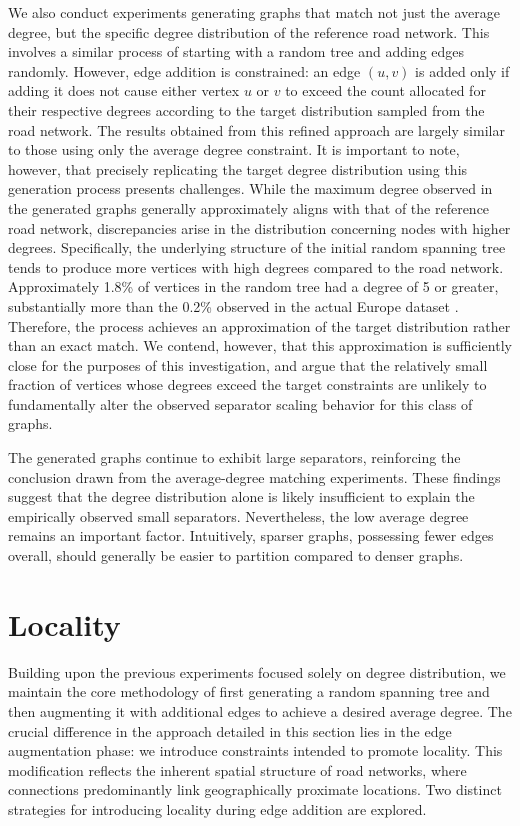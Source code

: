 We also conduct experiments generating graphs that match not just the average degree, but the specific degree distribution of the reference road network.
This involves a similar process of starting with a random tree and adding edges randomly.
However, edge addition is constrained: an edge \( (u, v) \) is added only if adding it does not cause either vertex \(u\) or \(v\) to exceed the count allocated for their respective degrees according to the target distribution sampled from the road network.
The results obtained from this refined approach are largely similar to those using only the average degree constraint.
It is important to note, however, that precisely replicating the target degree distribution using this generation process presents challenges.
While the maximum degree observed in the generated graphs generally approximately aligns with that of the reference road network, discrepancies arise in the distribution concerning nodes with higher degrees.
Specifically, the underlying structure of the initial random spanning tree tends to produce more vertices with high degrees compared to the road network.
Approximately 1.8\% of vertices in the random tree had a degree of 5 or greater, substantially more than the 0.2\% observed in the actual Europe dataset \cite{ptv_group_dimacs-europe_2009}.
Therefore, the process achieves an approximation of the target distribution rather than an exact match.
We contend, however, that this approximation is sufficiently close for the purposes of this investigation, and argue that the relatively small fraction of vertices whose degrees exceed the target constraints are unlikely to fundamentally alter the observed separator scaling behavior for this class of graphs.

The generated graphs continue to exhibit large separators, reinforcing the conclusion drawn from the average-degree matching experiments.
These findings suggest that the degree distribution alone is likely insufficient to explain the empirically observed small separators.
Nevertheless, the low average degree remains an important factor.
Intuitively, sparser graphs, possessing fewer edges overall, should generally be easier to partition compared to denser graphs.

\section{Locality}
\label{sec:synthetic:locality}

Building upon the previous experiments focused solely on degree distribution, we maintain the core methodology of first generating a random spanning tree and then augmenting it with additional edges to achieve a desired average degree.
The crucial difference in the approach detailed in this section lies in the edge augmentation phase: we introduce constraints intended to promote locality.
This modification reflects the inherent spatial structure of road networks, where connections predominantly link geographically proximate locations.
Two distinct strategies for introducing locality during edge addition are explored.

